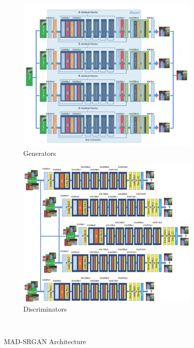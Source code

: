\documentclass[12pt,a4paper]{article}
\begin{document}
\begin{multicols}{2}
            \begin{figure}
                \centering
                \begin{subfigure}{0.4\textwidth}
                    \includegraphics[width=\textwidth]{images/mad-srgan-gen-arch.png}
                    \caption{Generators}
                \end{subfigure}
                \begin{subfigure}{0.4\textwidth}
                    \includegraphics[width=\textwidth]{images/mad-srgan-disc-arch.png}
                    \caption{Discriminators}
                \end{subfigure}\\[3mm]
                \caption{MAD-SRGAN Architecture}
                \label{fig:gen-arch}
            \end{figure}


\end{multicols}
\end{document}
